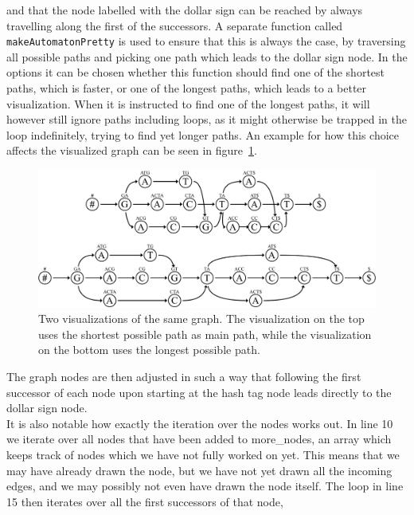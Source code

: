 \documentclass[a4paper,12pt,twoside,BCOR=10mm]{scrbook}
\begin{document}
and that the node labelled with the dollar sign can be reached by always travelling 
along the first of the successors. 
A separate function called \texttt{makeAutomatonPretty} is used to ensure that this is always the case, 
by traversing all possible paths and picking one path which leads to the dollar sign node. 
In the options it can be chosen whether this function 
should find one of the shortest paths, which is faster, or one of the longest paths, 
which leads to a better visualization. 
When it is instructed to find one of the longest paths, it will however still ignore 
paths including loops, as it might otherwise be trapped in the loop indefinitely, 
trying to find yet longer paths. 
An example for how this choice affects 
the visualized graph can be seen in figure~\ref{fig:evo_fig_visualize_short_vs_long}.  
\begin{figure}[!htb]
\centering
\includegraphics[width=\textwidth]{evo_fig_visualize_short_vs_long.pdf}
\caption[Visualizations of graph with shortest and longest main paths]{Two visualizations of the same graph. The visualization on the top uses the shortest possible path as main path, while the visualization on the bottom uses the longest possible path.} \label{fig:evo_fig_visualize_short_vs_long}
\end{figure}
The graph nodes are then adjusted in such a way that following the first successor of each 
node upon starting at the hash tag node leads directly to the dollar sign node. \\
It is also notable how exactly the iteration over the nodes works out. 
In line 10 we iterate over all nodes that have been added to more\_nodes, 
an array which keeps track of nodes which we have not fully worked on yet. 
This means that we may have already drawn the node, but we have not yet 
drawn all the incoming edges, and we may possibly not even have drawn the node itself. 
The loop in line 15 then iterates over all the first successors of that node, 
\end{document}
